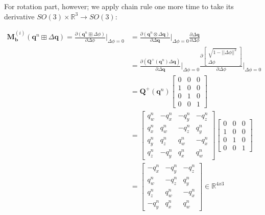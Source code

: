 \documentclass[a4paper]{report}
\numberwithin{figure}{section}
\newcommand{\R}{\mathbb{R}}
\begin{document}
For rotation part, however; we apply chain rule one more time to take its derivative 
$SO(3) \times \R^3 \rightarrow SO(3)$:

\begin{equation}
  \begin{aligned}
  \mathbf{M}^{(i)}_{\mathbf{b}}(\mathbf{q}^n \boxplus \Delta \mathbf{q}) = 
    \frac{\partial (\mathbf{q}^{n} \boxplus \Delta \phi)}{\partial \Delta \phi} 
    \bigg|_{\Delta \phi = 0} & =
\frac{\partial (\mathbf{q}^{n} \otimes \Delta \mathbf{q})}{\partial \Delta \mathbf{q}}
    \bigg|_{\Delta \phi = 0} 
    \frac{\partial \Delta \mathbf{q}}{\partial \Delta \phi} \\
    & =
    \frac{\partial (\mathbf{Q}^{+}(\mathbf{q}^{n}) \Delta \mathbf{q})}{\partial \Delta \mathbf{q}}
    \bigg|_{\Delta \phi = 0}
    \frac{\partial \begin{bmatrix} \sqrt{1-||\Delta \phi||^2} \\ \Delta \phi \end{bmatrix}}{\partial \Delta \phi}
    \bigg|_{\Delta \phi = 0} \\
    & =
\mathbf{Q}^{+}(\mathbf{q}^{n})
      \begin{bmatrix} 
        0 & 0 & 0 \\  
        1 & 0 & 0 \\  
        0 & 1 & 0 \\  
        0 & 0 & 1
      \end{bmatrix} \\
    & =
      \begin{bmatrix} 
        q_w^{n} & -q_x^{n} & -q_y^{n} & -q_z^{n}\\  
        q_x^{n} & q_w^{n} & -q_z^{n} & q_y^{n}\\  
        q_y^{n} & q_z^{n} & q_w^{n} & -q_x^{n}\\
        q_z^{n} & -q_y^{n} & q_x^{n} & q_w^{n}
      \end{bmatrix}
      \begin{bmatrix} 
        0 & 0 & 0 \\  
        1 & 0 & 0 \\  
        0 & 1 & 0 \\  
        0 & 0 & 1
      \end{bmatrix} \\ 
      & = 
      \begin{bmatrix} 
        -q_x^{n} & -q_y^{n} & -q_z^{n}\\  
        q_w^{n} & -q_z^{n} & q_y^{n}\\  
        q_z^{n} & q_w^{n} & -q_x^{n}\\
        -q_y^{n} & q_x^{n} & q_w^{n}
      \end{bmatrix} \in \R^{4x3}
  \end{aligned}
\end{equation}
\end{document}
